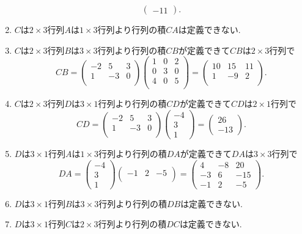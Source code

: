 \documentclass[dvipdfmx,a4paper,11pt]{article}
\theoremstyle{definition}
\begin{document}
\begin{enumerate}
$$\begin{pmatrix}
-11
 \end{pmatrix}.
$$
\item $C$は$2\times 3$行列$A$は$1 \times 3$行列より行列の積$CA$は定義できない.
\item $C$は$2 \times 3$行列$B$は$3 \times 3$行列より行列の積$CB$が定義できて$CB$は$2\times 3$行列で
$$
CB
= 
  \begin{pmatrix}
 -2 &5 & 3\\
1 &-3&0  \\
 \end{pmatrix}
\begin{pmatrix} %
 1& 0 & 2\\
 0 & 3 & 0\\
 4 & 0 & 5 \\
 \end{pmatrix} 
 =
 \begin{pmatrix} %
10 & 15 & 11\\
1 & -9 & 2\\
 \end{pmatrix}.
$$
\item $C$は$2 \times 3$行列$D$は$3\times 1$行列より行列の積$CD$が定義できて$CD$は$2 \times 1$行列で
$$
CD
= 
  \begin{pmatrix}
 -2 &5 & 3\\
1 &-3&0  \\
 \end{pmatrix}
\begin{pmatrix} %
 -4\\
 3 \\
 1
 \end{pmatrix}
 =
 \begin{pmatrix} %
26 \\
-13
 \end{pmatrix}.
$$
\item $D$は$3\times 1$行列$A$は$1 \times 3$行列より行列の積$DA$が定義できて$DA$は$3 \times 3$行列で
$$
DA
= 
\begin{pmatrix} %
 -4\\
 3 \\
 1
 \end{pmatrix}
 \begin{pmatrix} %
 -1 & 2 &-5  \\
 \end{pmatrix} 
 =
 \begin{pmatrix} %
4 & -8 & 20 \\
-3 & 6 & -15\\
-1 & 2 & -5
 \end{pmatrix}.
$$
\item $D$は$3\times 1$行列$B$は$3 \times 3$行列より行列の積$DB$は定義できない.
\item $D$は$3\times 1$行列$C$は$2 \times 3$行列より行列の積$DC$は定義できない.
\end{enumerate}
\end{document}
